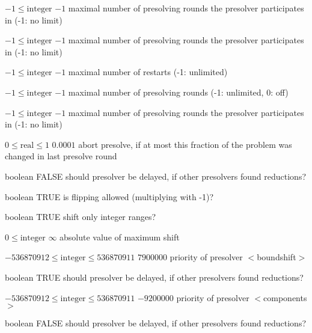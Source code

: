 %
{$-1\leq\textrm{integer}$}%
{$-1$}%
{maximal number of presolving rounds the presolver participates in (-1: no limit)}%
{}

%
{$-1\leq\textrm{integer}$}%
{$-1$}%
{maximal number of presolving rounds the presolver participates in (-1: no limit)}%
{}

%
{$-1\leq\textrm{integer}$}%
{$-1$}%
{maximal number of restarts (-1: unlimited)}%
{}

%
{$-1\leq\textrm{integer}$}%
{$-1$}%
{maximal number of presolving rounds (-1: unlimited, 0: off)}%
{}

%
{$-1\leq\textrm{integer}$}%
{$-1$}%
{maximal number of presolving rounds the presolver participates in (-1: no limit)}%
{}

%
{$0\leq\textrm{real}\leq1$}%
{$0.0001$}%
{abort presolve, if at most this fraction of the problem was changed in last presolve round}%
{}

%
{boolean}%
{FALSE}%
{should presolver be delayed, if other presolvers found reductions?}%
{}

%
{boolean}%
{TRUE}%
{is flipping allowed (multiplying with -1)?}%
{}

%
{boolean}%
{TRUE}%
{shift only integer ranges?}%
{}

%
{$0\leq\textrm{integer}$}%
{$\infty$}%
{absolute value of maximum shift}%
{}

%
{$-536870912\leq\textrm{integer}\leq536870911$}%
{$7900000$}%
{priority of presolver $<$boundshift$>$}%
{}

%
{boolean}%
{TRUE}%
{should presolver be delayed, if other presolvers found reductions?}%
{}

%
{$-536870912\leq\textrm{integer}\leq536870911$}%
{$-9200000$}%
{priority of presolver $<$components$>$}%
{}

%
{boolean}%
{FALSE}%
{should presolver be delayed, if other presolvers found reductions?}%
{}

